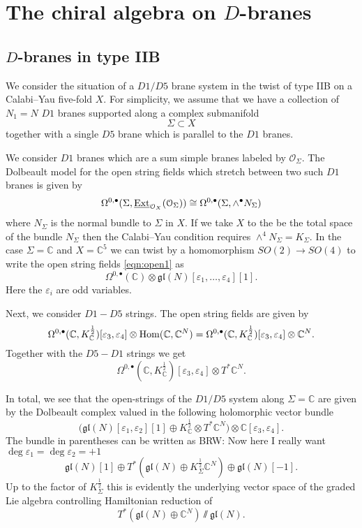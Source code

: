 \documentclass[11pt]{amsart}
\newcommand{\CC}{\mathbb C}
\newcommand{\mc}{\mathcal}
\def\ep{\varepsilon}
\def\bu{{\bullet}}
\def\cO{\mc O}
\def\lie#1{\ensuremath{\mathfrak{#1}}}
\def\brian#1{{\textcolor{blue!65!red}{BRW: {#1}}}}
\def\beqn{\begin{equation}}
\def\eeqn{\end{equation}}
\theoremstyle{thm}
\numberwithin{equation}{subsection}
\theoremstyle{def}
\theoremstyle{rem}
\begin{document}
\section{The chiral algebra on $D$-branes} 

\subsection{$D$-branes in type IIB}

We consider the situation of a $D1/D5$ brane system in the twist of type IIB on a Calabi--Yau five-fold $X$. 
For simplicity, we assume that we have a collection of $N_1 = N$ $D1$ branes supported along a complex submanifold
\[
\Sigma \subset X 
\]
together with a single $D5$ brane which is parallel to the $D1$ branes. 

We consider $D1$ branes which are a sum simple branes labeled by $\cO_\Sigma$.
The Dolbeault model for the open string fields which stretch between two such $D1$ branes is given by 
\beqn\label{eqn:open1}
\Omega^{0,\bu}(\Sigma, \underline{\rm Ext}_{\cO_X}(\cO_\Sigma)) \cong \Omega^{0,\bu}(\Sigma, \wedge^\bu N_\Sigma) 
\eeqn
where $N_\Sigma$ is the normal bundle to $\Sigma$ in $X$. 
If we take $X$ to the be the total space of the bundle $N_\Sigma$ then the Calabi--Yau condition requires $\wedge^4 N_\Sigma = K_\Sigma$. 
In the case $\Sigma = \CC$ and $X = \CC^5$ we can twist by a homomorphism $SO(2) \to SO(4)$ to 
write the open string fields \eqref{eqn:open1} as 
\beqn\label{eqn:open1a}
\Omega^{0,\bu}(\CC) \otimes \lie{gl}(N) [\ep_1,\ldots,\ep_4] [1] .
\eeqn
Here the $\ep_i$ are odd variables. 

Next, we consider $D1-D5$ strings. 
The open string fields are given by 
\beqn\label{eqn:open15}
\Omega^{0,\bu}(\CC, K^{\frac12}_\CC)  [\ep_3,\ep_4] \otimes {\rm Hom}(\CC, \CC^N) = \Omega^{0,\bu}(\CC, K^{\frac12}_\CC)  [\ep_3,\ep_4] \otimes \CC^N .
\eeqn
Together with the $D5-D1$ strings we get 
\beqn\label{eqn:open15a}
\Omega^{0,\bu}(\CC, K^{\frac12}_\CC)  [\ep_3,\ep_4] \otimes T^*\CC^N .
\eeqn

In total, we see that the open-strings of the $D1/D5$ system along $\Sigma = \CC$ are given by the Dolbeault complex valued in the following holomorphic vector bundle
\beqn
\bigg(\lie{gl}(N)[\ep_1,\ep_2][1] \oplus K^{\frac12}_\CC \otimes T^*\CC^N \bigg) \otimes \CC[\ep_3,\ep_4] .
\eeqn
The bundle in parentheses can be written as 
\brian{Now here I really want $\deg{\ep_1}=\deg{\ep_2} = +1$}
\beqn
\lie{gl}(N)[1] \oplus T^* \left(\lie{gl}(N) \oplus K^{\frac12}_\Sigma \CC^N\right) \oplus \lie{gl}(N) [-1] .
\eeqn
Up to the factor of $K^{\frac12}_\Sigma$ this is evidently the underlying vector space of the graded Lie algebra controlling Hamiltonian reduction of 
\beqn
T^*(\lie{gl}(N) \oplus \CC^N) \sslash \lie{gl}(N) .
\eeqn
\end{document}

